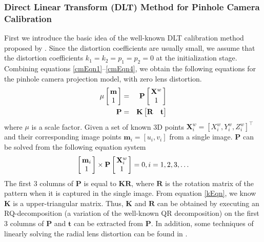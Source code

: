 \documentclass{report}
\begin{document}
\subsubsection{Direct Linear Transform (DLT) Method for Pinhole Camera Calibration}
First we introduce the basic idea of the well-known DLT calibration method proposed by \cite{abdelaziz1971}. Since the distortion coefficients are usually small, we assume that the distortion coefficients $k_1 = k_2 = p_1 = p_2 = 0$ at the initialization stage. Combining equations \ref{cmEqn1}--\ref{cmEqn4}, we obtain the following equations for the pinhole camera projection model, with zero lens distortion. 
\begin{eqnarray}
\mu \arraycolsep=1.5pt%
\begin{bmatrix}
	\begin{array}{c}
	\mathbf{m} \\ 1
	\end{array}
\end{bmatrix}
 &=& \mathbf{P} 
\arraycolsep=1.5pt%
\begin{bmatrix}
	\begin{array}{c}
	\mathbf{X}^w \\ 1
	\end{array}
\end{bmatrix} \\
\mathbf{P} &=& \mathbf{K} 
\begin{bmatrix}
\mathbf{R} & \mathbf{t}
\end{bmatrix} 
\end{eqnarray}
where $\mu$ is a scale factor. Given a set of known 3D points $\mathbf{X}^w_i = [X_i^w, Y_i^w, Z_i^w]^\top$ and their corresponding image points $\mathbf{m}_i = [u_i, v_i]$ from a single image. $\mathbf{P}$ can be solved from the following equation system 
\begin{equation}
\arraycolsep=1.5pt%
\begin{bmatrix}
	\begin{array}{c}
	\mathbf{m}_i \\ 1
	\end{array}
\end{bmatrix}
 \times \mathbf{P} 
\arraycolsep=1.5pt%
\begin{bmatrix}
	\begin{array}{c}
	\mathbf{X}^w_i \\ 1
	\end{array}
\end{bmatrix}
 = 0, i = 1, 2, 3, \dots
\label{dltLS}
\end{equation}
The first 3 columns of $\mathbf{P}$ is equal to $\mathbf{K} \mathbf{R}$, where $\mathbf{R}$ is the rotation matrix of the pattern when it is captured in the single image. From equation \ref{kEqn}, we know $\mathbf{K}$ is a upper-triangular matrix. Thus, $\mathbf{K}$ and $\mathbf{R}$ can be obtained by executing an RQ-decomposition (a variation of the well-known QR decomposition) on the first 3 columns of $\mathbf{P}$ and $\mathbf{t}$ can be extracted from $\mathbf{P}$. In addition, some techniques of linearly solving the radial lens distortion can be found in \cite{abdelaziz1971}. 
\end{document}

